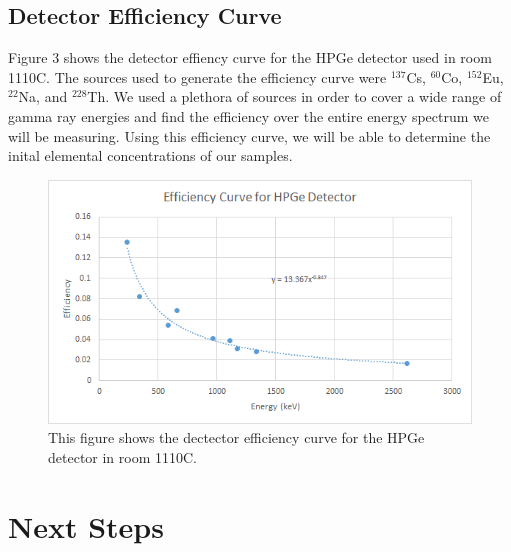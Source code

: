 \documentclass[]{article}
\begin{document}
\pagebreak


\subsection{Detector Efficiency Curve}

Figure 3 shows the detector effiency curve for the HPGe detector used in room 1110C. The sources used to generate the efficiency curve were $^{137}$Cs, $^{60}$Co, $^{152}$Eu, $^{22}$Na, and $^{228}$Th. We used a plethora of sources in order to cover a wide range of gamma ray energies and find the efficiency over the entire energy spectrum we will be measuring. Using this efficiency curve, we will be able to determine the inital elemental concentrations of our samples.


\begin{figure}[h]
\centering
\includegraphics[scale=0.6]{Efficiency}
\caption{This figure shows the dectector efficiency curve for the HPGe detector in room 1110C.}
\end{figure} 

\pagebreak

\section{Next Steps}
  
\end{document}
